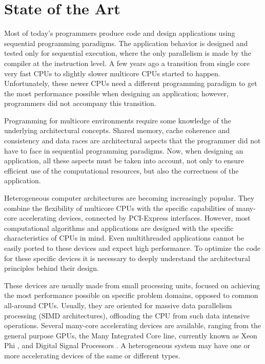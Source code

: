 
\chapter{State of the Art}

Most of today’s programmers produce code and design applications using sequential programming paradigms. The application behavior is designed and tested only for sequential execution, where the only parallelism is made by the compiler at the instruction level. A few years ago a transition from single core very fast CPUs to slightly slower multicore CPUs started to happen. Unfortunately, these newer CPUs need a different programming paradigm to get the most performance possible when designing an application; however, programmers did not accompany this transition.

Programming for multicore environments require some knowledge of the underlying architectural concepts. Shared memory, cache coherence and consistency and data races are architectural aspects that the programmer did not have to face in sequential programming paradigms. Now, when designing an application, all these aspects must be taken into account, not only to ensure efficient use of the computational resources, but also the correctness of the application.

Heterogeneous computer architectures are becoming increasingly popular. They combine the flexibility of multicore CPUs with the specific capabilities of many-core accelerating devices, connected by PCI-Express interfaces. However, most computational algorithms and applications are designed with the specific characteristics of CPUs in mind. Even multithreaded applications cannot be easily ported to these devices and expect high performance. To optimize the code for these specific devices it is necessary to deeply understand the architectural principles behind their design.

These devices are usually made from small processing units, focused on achieving the most performance possible on specific problem domains, opposed to common all-around CPUs. Usually, they are oriented for massive data parallelism processing (SIMD architectures), offloading the CPU from such data intensive operations. Several many-core accelerating devices are available, ranging from the general purpose GPUs, the \intel Many Integrated Core line, currently known as \intel Xeon Phi \cite{Intel:MIC}, and Digital Signal Processors \cite{Texas:DSP}. A heterogeneous system may have one or more accelerating devices of the same or different types.

